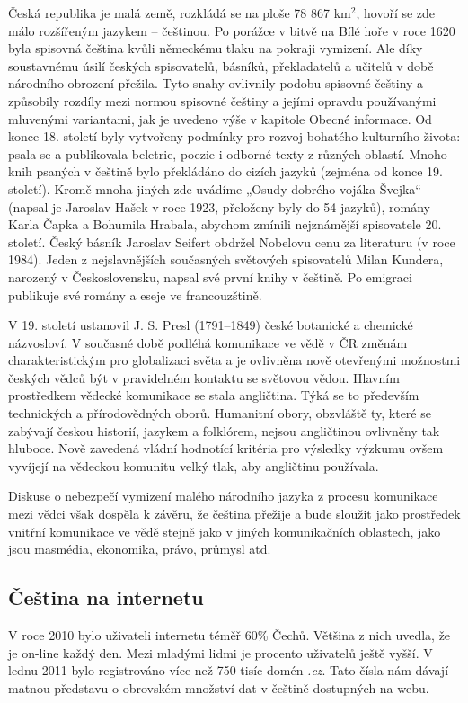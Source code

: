 \documentclass[]{../../metanetpaper}
\begin{document}
\begin{multicols}{2}
Česká republika je malá země, rozkládá se na ploše 78 867 km$^{\textrm{2}}$, hovoří se zde málo rozšířeným jazykem – češtinou. Po porážce v bitvě na Bílé hoře v roce 1620 byla spisovná čeština kvůli německému tlaku na pokraji vymizení. Ale díky soustavnému úsilí českých spisovatelů, básníků, překladatelů a učitelů v době národního obrození přežila. Tyto snahy ovlivnily podobu spisovné češtiny a způsobily rozdíly mezi normou spisovné češtiny a jejími opravdu používanými mluvenými variantami, jak je uvedeno výše v kapitole Obecné informace. Od konce 18. století byly vytvořeny podmínky pro rozvoj bohatého kulturního života: psala se a publikovala beletrie, poezie i odborné texty z různých oblastí. Mnoho knih psaných v češtině bylo překládáno do cizích jazyků (zejména od konce 19. století). Kromě mnoha jiných zde uvádíme „Osudy dobrého vojáka Švejka“ (napsal je Jaroslav Hašek v roce 1923, přeloženy byly do 54 jazyků), romány Karla Čapka a Bohumila Hrabala, abychom zmínili nejznámější spisovatele 20. století. Český básník Jaroslav Seifert obdržel Nobelovu cenu za literaturu (v roce 1984). Jeden z nejslavnějších současných světových spisovatelů Milan Kundera, narozený v Československu, napsal své první knihy v češtině. Po emigraci publikuje své romány a eseje ve francouzštině.

V 19. století ustanovil J. S. Presl (1791–1849) české botanické a chemické názvosloví. V současné době podléhá komunikace ve vědě v ČR změnám charakteristickým pro globalizaci světa a je ovlivněna nově otevřenými možnostmi českých vědců být v pravidelném kontaktu se světovou vědou. Hlavním prostředkem vědecké komunikace se stala angličtina. Týká se to především technických a přírodovědných oborů. Humanitní obory, obzvláště ty, které se zabývají českou historií, jazykem a folklórem, nejsou angličtinou ovlivněny tak hluboce. Nově zavedená vládní hodnotící kritéria pro výsledky výzkumu ovšem vyvíjejí na vědeckou komunitu velký tlak, aby angličtinu používala.

Diskuse o nebezpečí vymizení malého národního jazyka z procesu komunikace mezi vědci však dospěla k závěru, že čeština přežije a bude sloužit jako prostředek vnitřní komunikace ve vědě stejně jako v jiných komunikačních oblastech, jako jsou masmédia, ekonomika, právo, průmysl atd.

\subsection{Čeština na internetu}

V roce 2010 bylo uživateli internetu téměř 60\% Čechů. Většina z nich uvedla, že je on-line každý den. Mezi mladými lidmi je procento uživatelů ještě vyšší. V lednu 2011 bylo registrováno více než 750 tisíc domén \emph{.cz}. Tato čísla nám dávají matnou představu o obrovském množství dat v češtině dostupných na webu.


\end{multicols}
\end{document}
